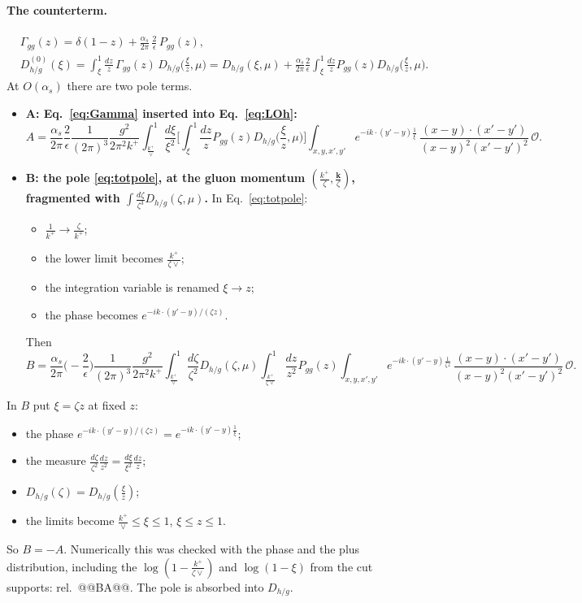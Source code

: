 \documentclass[10pt]{article}
\numberwithin{equation}{section}
\newcommand{\OO}{\mathcal O}
\newcommand{\preLO}{\frac{1}{(2\pi)^3}\frac{g^2}{2\pi^2k^+}}
\newcommand{\XX}{\frac{(x-y)\cdot(x'-y')}{(x-y)^{2}(x'-y')^{2}}}
\newcommand{\ph}{e^{-ik\cdot(y'-y)\frac{1}{\xi}}}
\begin{document}
\paragraph{The counterterm.}
\begin{equation}
\boxed{\begin{aligned}&\Gamma_{gg}(z)=\delta(1-z)+\frac{\alpha_s}{2\pi}\,\frac{2}{\epsilon}\,P_{gg}(z),\\
&D^{(0)}_{h/g}(\xi)=\int_\xi^1\frac{dz}{z}\,\Gamma_{gg}(z)\,D_{h/g}\Big(\frac{\xi}{z},\mu\Big)=D_{h/g}(\xi,\mu)+\frac{\alpha_s}{2\pi}\frac{2}{\epsilon}\int_\xi^1\frac{dz}{z}P_{gg}(z)D_{h/g}\Big(\frac{\xi}{z},\mu\Big).\end{aligned}}
\label{eq:Gamma}
\end{equation}
At $O(\alpha_s)$ there are two pole terms.
\begin{itemize}
\item \textbf{A: Eq.~\eqref{eq:Gamma} inserted into Eq.~\eqref{eq:LOh}:}
\begin{equation*}
A=\frac{\alpha_s}{2\pi}\frac{2}{\epsilon}\preLO\int_{\frac{k^+}{\vee}}^1\frac{d\xi}{\xi^2}\Big[\int_\xi^1\frac{dz}{z}P_{gg}(z)D_{h/g}\Big(\frac{\xi}{z},\mu\Big)\Big]\int_{x,y,x',y'}\ph\,\XX\,\OO .
\end{equation*}
\item \textbf{B: the pole \eqref{eq:totpole}, at the gluon momentum $(\frac{k^+}{\zeta},\frac{\mathbf k}{\zeta})$, fragmented with $\int\frac{d\zeta}{\zeta^3}D_{h/g}(\zeta,\mu)$.} In Eq.~\eqref{eq:totpole}:
\begin{itemize}
\item $\frac{1}{k^+}\to\frac{\zeta}{k^+}$;
\item the lower limit becomes $\frac{k^+}{\zeta\vee}$;
\item the integration variable is renamed $\xi\to z$;
\item the phase becomes $e^{-ik\cdot(y'-y)/(\zeta z)}$.
\end{itemize}
Then
\begin{equation*}
B=\frac{\alpha_s}{2\pi}\Big(-\frac{2}{\epsilon}\Big)\preLO\int_{\frac{k^+}{\vee}}^1\frac{d\zeta}{\zeta^2}D_{h/g}(\zeta,\mu)\int_{\frac{k^+}{\zeta\vee}}^1\frac{dz}{z^2}P_{gg}(z)\int_{x,y,x',y'}e^{-ik\cdot(y'-y)\frac{1}{\zeta z}}\,\XX\,\OO .
\end{equation*}
\end{itemize}
In $B$ put $\xi=\zeta z$ at fixed $z$:
\begin{itemize}
\item the phase $e^{-ik\cdot(y'-y)/(\zeta z)}=\ph$;
\item the measure $\frac{d\zeta}{\zeta^2}\frac{dz}{z^2}=\frac{d\xi}{\xi^2}\frac{dz}{z}$;
\item $D_{h/g}(\zeta)=D_{h/g}(\frac{\xi}{z})$;
\item the limits become $\frac{k^+}{\vee}\le\xi\le1$, $\xi\le z\le1$.
\end{itemize}
So $B=-A$. Numerically this was checked with the phase and the plus distribution, including the $\log(1-\frac{k^+}{\zeta\vee})$ and $\log(1-\xi)$ from the cut supports: rel.\ @@BA@@. The pole is absorbed into $D_{h/g}$.
\end{document}
